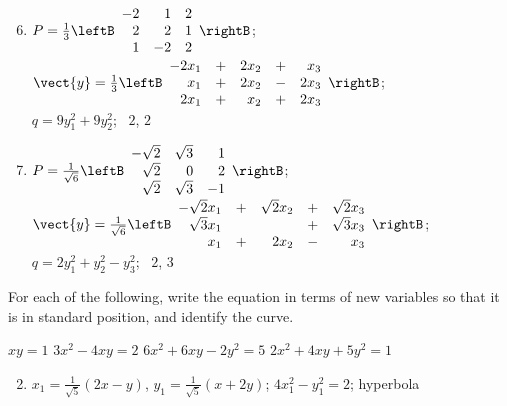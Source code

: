 \begin{multicols}{2}
\begin{ex}
\begin{sol}
\begin{enumerate}[label={\alph*.}]
\setcounter{enumi}{5}
\item $P = \frac{1}{3}\leftB \begin{array}{rrr}
-2 & 1 & 2 \\
2 & 2 & 1 \\
1 & -2 & 2
\end{array}\rightB$; \\ 
$\vect{y} = \frac{1}{3}\leftB \begin{array}{rcrcr}
-2x_{1} & + & 2x_{2} & + & x_{3} \\
x_{1} & + & 2x_{2} & - & 2x_{3} \\
2x_{1} & + & x_{2} & + & 2x_{3} 
\end{array}\rightB$; \\ 
$q = 9y_{1}^2 + 9y_{2}^2$; \ $2$, $2$

\setcounter{enumi}{7}
\item  $P = \frac{1}{\sqrt{6}}\leftB \begin{array}{rrr}
-\sqrt{2} & \sqrt{3} & 1 \\
\sqrt{2} & 0 & 2 \\
\sqrt{2} & \sqrt{3} & -1
\end{array}\rightB$; \\ 
$\vect{y} = \frac{1}{\sqrt{6}}\leftB \begin{array}{rcrcr}
-\sqrt{2}x_{1} & + & \sqrt{2}x_{2} & + & \sqrt{2}x_{3} \\
\sqrt{3}x_{1} & & & + & \sqrt{3}x_{3} \\
x_{1} & + & 2x_{2} & - & x_{3} 
\end{array}\rightB$; \\
$q = 2y_{1}^2 + y_{2}^2 - y_{3}^2$; \ $2$, $3$


\end{enumerate}
\end{sol}
\end{ex}

\begin{ex}
For each of the following, write the equation in terms of new variables so that it is in standard position, and identify the curve.

\begin{exenumerate}
\exitem $xy = 1$
\exitem $3x^{2} - 4xy = 2$
\exitem $6x^{2} + 6xy - 2y^{2} = 5$
\exitem $2x^{2} + 4xy + 5y^{2} = 1$
\end{exenumerate}
\begin{sol}
\begin{enumerate}[label={\alph*.}]
\setcounter{enumi}{1}
\item $x_{1} = \frac{1}{\sqrt{5}}(2x - y)$, $y_{1} = \frac{1}{\sqrt{5}}(x + 2y)$; $4x_{1}^2 - y_{1}^2 = 2$; hyperbola


\end{enumerate}
\end{sol}
\end{ex}
\end{multicols}
